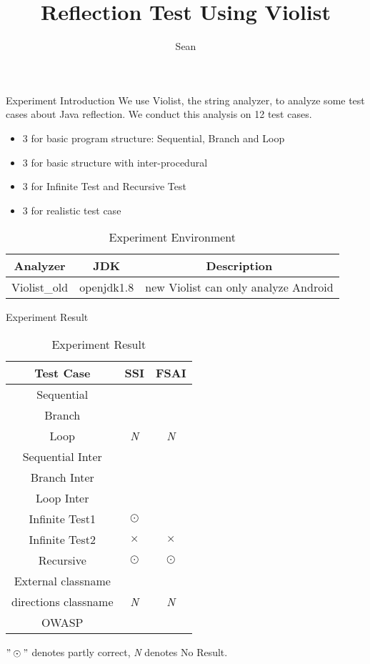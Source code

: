 \documentclass{beamer}
\title
{Reflection Test Using Violist}
\author %
{Sean}
\institute[Universities of Somewhere and Elsewhere] %
{
  Department of Information Science\\
  Jinan University
}
\begin{document}
\begin{frame}
  \titlepage
\end{frame}

\begin{frame}	{Experiment Introduction}
	We use Violist, the string analyzer, to analyze some test cases about Java reflection. We conduct this analysis on 12 test cases. 
\begin{itemize}
	\item 3 for basic program structure: Sequential, Branch and Loop
	\item 3 for basic structure with inter-procedural
	\item 3 for Infinite Test and Recursive Test
	\item 3 for realistic test case
\end{itemize}
	\begin{table}
		\centering
		\caption{Experiment Environment}
		\begin{tabular}{|c|c|c|}
		\hline
		Analyzer&JDK&Description\\
		\hline
		Violist\_old&openjdk1.8&new Violist can only analyze Android\\
		\hline
		\end{tabular}
	\end{table}
\end{frame}

\begin{frame}{Experiment Result}
\begin{table}
	\centering
	\caption{Experiment Result}
	\begin{tabular}{ccc}
	\hline
	\textbf{Test Case}&\textbf{SSI}&\textbf{FSAI}\\
	\hline
	Sequential&\checkmark&\checkmark\\
	Branch&\checkmark&\checkmark\\
	Loop&\emph{N}&\emph{N}\\
	Sequential Inter&\checkmark&\checkmark\\
	Branch Inter&\checkmark&\checkmark\\
	Loop Inter&\checkmark&\checkmark\\
	Infinite Test1&$\odot$&\checkmark\\
	Infinite Test2&$\times$&$\times$\\
	Recursive&$\odot$&$\odot$\\
	External classname&\checkmark&\checkmark\\
	directions classname&\emph{N}&\emph{N}\\
	OWASP&\checkmark&\checkmark\\
	\hline
	\end{tabular}
\end{table}
$"\odot"$ denotes partly correct, \emph{N} denotes No Result.
\end{frame}
\end{document}
